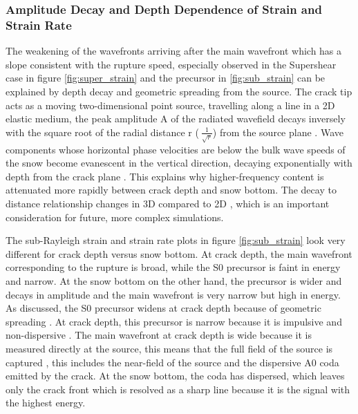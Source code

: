 \subsubsection{Amplitude Decay and Depth Dependence of Strain and Strain Rate}

The weakening of the wavefronts arriving after the main wavefront which has a slope consistent with the rupture speed, especially observed in the Supershear case in figure \ref{fig:super_strain} and the precursor in \ref{fig:sub_strain} can be explained by depth decay and geometric spreading from the source. The crack tip acts as a moving two-dimensional point source, travelling along a line in a 2D elastic medium, the peak amplitude A of the radiated wavefield decays inversely with the square root of the radial distance r ($\ \frac{1}{\sqrt{r}}$) from the source plane \parencite{achenbachWavePropagationElastic2012}.  Wave components whose horizontal phase velocities are below the bulk wave speeds of the snow become evanescent in the vertical direction, decaying exponentially with depth from the crack plane \parencite{graffWaveMotionElastic1975}. This explains why higher-frequency content is attenuated more rapidly between crack depth and snow bottom. The decay to distance relationship changes in 3D compared to 2D \parencite{achenbachWavePropagationElastic2012}, which is an important consideration for future, more complex simulations.\par

The sub-Rayleigh strain and strain rate plots in figure \ref{fig:sub_strain} look very different for crack depth versus snow bottom. At crack depth, the main wavefront corresponding to the rupture is broad, while the S0 precursor is faint in energy and narrow. At the snow bottom on the other hand, the precursor is wider and decays in amplitude and the main wavefront is very narrow but high in energy. As discussed, the S0 precursor widens at crack depth because of geometric spreading \parencite{achenbachCHAPTER6WITHDRAWN1975}. At crack depth, this precursor is narrow because it is impulsive and non-dispersive \parencite{roseWavesPlates2014}. The main wavefront at crack depth is wide because it is measured directly at the source, this means that the full field of the source is captured \parencite{roseWavesPlates2014}, this includes the near-field of the source and the dispersive A0 coda emitted by the crack. At the snow bottom, the coda has dispersed, which leaves only the crack front which is resolved as a sharp line because it is the signal with the highest energy. \par



